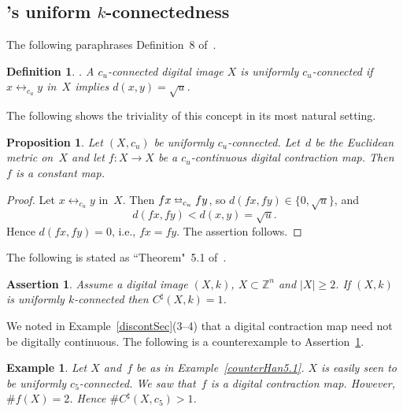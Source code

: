 \documentclass{article}
\newtheorem{prop}[thm]{Proposition}
\newtheorem{assert}[thm]{Assertion}
\newtheorem{definition}[thm]{Definition}
\newtheorem{exl}[thm]{Example}
\numberwithin{thm}{section}
\newcommand{\adj}{\leftrightarrow}
\newcommand{\adjeq}{\leftrightarroweq}
\def\Z{{\mathbb Z}}
\begin{document}
\subsection{\cite{Han19}'s uniform $k$-connectedness}
\label{unifConnected}
The following paraphrases Definition~8 of~\cite{Han19}.

\begin{definition}
    {\rm \cite{Han19}}.
    \label{unifConnected}
    A $c_u$-connected digital
    image $X$ is {\em uniformly $c_u$-connected}
    if $x \adj_{c_u} y$ in~$X$
    implies $d(x,y) = \sqrt{u}$.
\end{definition}

The following shows the triviality of
this concept in its most natural
setting.

\begin{prop}
    \label{unifConnectedTriv}
    Let $(X,c_u)$ be uniformly 
    $c_u$-connected. Let~$d$ be
    the Euclidean metric on~$X$ and let
    $f: X \to X$ be a $c_u$-continuous
    digital contraction map. Then~$f$
    is a constant map.
\end{prop}

\begin{proof}
    Let $x \adj_{c_u} y$ in~$X$.
    Then $fx \adjeq_{c_u} fy$, so
    $d(fx,fy) \in \{0,\sqrt{u} \}$, and
    \[ d(fx,fy) < d(x,y) = \sqrt{u}.
    \]
    Hence $d(fx,fy) = 0$, i.e., $fx=fy$.
    The assertion follows.
\end{proof}

The following is stated as
``Theorem"~5.1 of~\cite{Han19}.

\begin{assert}
    \label{Han5.1}
    Assume a digital image
    $(X,k)$, $X \subset \Z^n$
    and $|X| \ge 2$.
    If $(X,k)$ is uniformly 
    $k$-connected then 
    $C^{\sharp}(X,k) = 1$.
\end{assert}

We noted in
Example~\ref{discontSec}(3--4) that
a digital contraction
map need not be
digitally continuous.
The following is a
counterexample to
Assertion~\ref{Han5.1}.

\begin{exl}
  Let $X$ and~$f$ be as in
    Example~\ref{counterHan5.1}.
    $X$ is easily seen to be
    uniformly $c_5$-connected.
We saw that~$f$ is
    a digital contraction map.
    However, $\#f(X) = 2$.
    Hence $\#C^{\sharp}(X,c_5) > 1$.
\end{exl}
\end{document}
